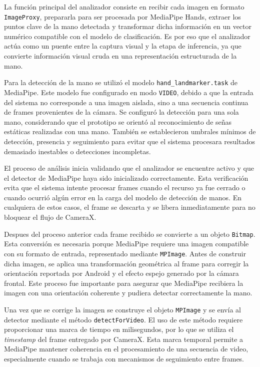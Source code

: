 	La función principal del analizador consiste en recibir cada imagen en formato \texttt{ImageProxy}, prepararla para ser procesada por MediaPipe Hands, extraer los puntos clave de la mano detectada y transformar dicha información en un vector numérico compatible con el modelo de clasificación. Es por eso que el analizador actúa como un puente entre la captura visual y la etapa de inferencia, ya que convierte información visual cruda en una representación estructurada de la mano.
	
	Para la detección de la mano se utilizó el modelo \texttt{hand\_landmarker.task} de MediaPipe. Este modelo fue configurado en modo \texttt{VIDEO}, debido a que la entrada del sistema no corresponde a una imagen aislada, sino a una secuencia continua de frames provenientes de la cámara. Se configuró la detección para una sola mano, considerando que el prototipo se orientó al reconocimiento de señas estáticas realizadas con una mano. También se establecieron umbrales mínimos de detección, presencia y seguimiento para evitar que el sistema procesara resultados demasiado inestables o detecciones incompletas.
	
	El proceso de análisis inicia validando que el analizador se encuentre activo y que el detector de MediaPipe haya sido inicializado correctamente. Esta verificación evita que el sistema intente procesar frames cuando el recurso ya fue cerrado o cuando ocurrió algún error en la carga del modelo de detección de manos. En cualquiera de estos casos, el frame se descarta y se libera inmediatamente para no bloquear el flujo de CameraX.
	
	Despues del proceso anterior cada frame recibido se convierte a un objeto \texttt{Bitmap}. Esta conversión es necesaria porque MediaPipe requiere una imagen compatible con su formato de entrada, representado mediante \texttt{MPImage}. Antes de construir dicha imagen, se aplica una transformación geométrica al frame para corregir la orientación reportada por Android y el efecto espejo generado por la cámara frontal. Este proceso fue importante para asegurar que MediaPipe recibiera la imagen con una orientación coherente y pudiera detectar correctamente la mano.
	
	Una vez que se corrige la imagen se construye el objeto \texttt{MPImage} y se envía al detector mediante el método \texttt{detectForVideo}. El uso de este método requiere proporcionar una marca de tiempo en milisegundos, por lo que se utiliza el \textit{timestamp} del frame entregado por CameraX. Esta marca temporal permite a MediaPipe mantener coherencia en el procesamiento de una secuencia de video, especialmente cuando se trabaja con mecanismos de seguimiento entre frames.
	
